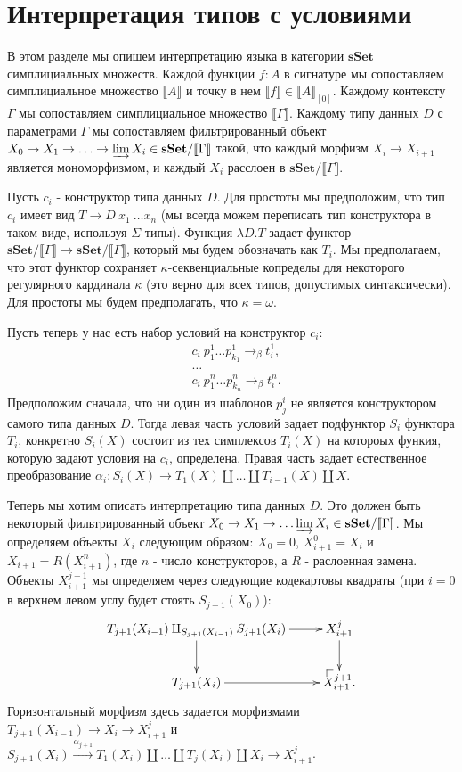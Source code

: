 \documentclass{amsart}
\makeatletter
\theoremstyle{definition}
\theoremstyle{remark}
\newcommand{\cat}[1]{\mathbf{#1}}
\newcommand{\sSet}{\cat{sSet}}
\renewcommand{\ll}{\llbracket}
\newcommand{\rr}{\rrbracket}
\numberwithin{figure}{section}
\newcommand{\po}[1][dr]{\save*!/#1+1.2pc/#1:(1,-1)@^{|-}\restore}
\makeatother
\begin{document}
\section{Интерпретация типов с условиями}

В этом разделе мы опишем интерпретацию языка в категории $\sSet$ симплициальных множеств.
Каждой функции $f : A$ в сигнатуре мы сопоставляем симплициальное множество $\ll A \rr$ и точку в нем $\ll f \rr \in \ll A \rr_{[0]}$.
Каждому контексту $\Gamma$ мы сопоставляем симплициальное множество $\ll \Gamma \rr$.
Каждому типу данных $D$ с параметрами $\Gamma$ мы сопоставляем фильтрированный объект $X_0 \to X_1 \to \ldots \to \varinjlim X_i \in \sSet / \ll \Gamma \rr$ такой,
    что каждый морфизм $X_i \to X_{i + 1}$ является мономорфизмом, и каждый $X_i$ расслоен в $\sSet / \ll \Gamma \rr$.

Пусть $c_i$ - конструктор типа данных $D$.
Для простоты мы предположим, что тип $c_i$ имеет вид $T \to D\ x_1\ \ldots x_n$ (мы всегда можем переписать тип конструктора в таком виде, используя $\Sigma$-типы).
Функция $\lambda D. T$ задает функтор $\sSet / \ll \Gamma \rr \to \sSet / \ll \Gamma \rr$, который мы будем обозначать как $T_i$.
Мы предполагаем, что этот функтор сохраняет $\kappa$-секвенциальные копределы для некоторого регулярного кардинала $\kappa$ (это верно для всех типов, допустимых синтаксически).
Для простоты мы будем предполагать, что $\kappa = \omega$.

Пусть теперь у нас есть набор условий на конструктор $c_i$:
\begin{align*}
& c_i\ p^1_1 \ldots p^1_{k_1} \to_\beta t^1_i, \\
& \ldots \\
& c_i\ p^n_1 \ldots p^n_{k_n} \to_\beta t^n_i.
\end{align*}
Предположим сначала, что ни один из шаблонов $p^i_j$ не является конструктором самого типа данных $D$.
Тогда левая часть условий задает подфунктор $S_i$ функтора $T_i$, конкретно $S_i(X)$ состоит из тех симплексов $T_i(X)$ на котороых функия, которую задают условия на $c_i$, определена.
Правая часть задает естественное преобразование $\alpha_i : S_i(X) \to T_1(X) \amalg \ldots \amalg T_{i-1}(X) \amalg X$.

Теперь мы хотим описать интерпретацию типа данных $D$. Это должен быть некоторый фильтрированный объект $X_0 \to X_1 \to \ldots \varinjlim X_i \in \sSet / \ll \Gamma \rr$.
Мы определяем объекты $X_i$ следующим образом: $X_0 = 0$, $X^0_{i+1} = X_i$ и $X_{i+1} = R(X^n_{i+1})$, где $n$ - число конструкторов, а $R$ - раслоенная замена.
Объекты $X^{j+1}_{i+1}$ мы определяем через следующие кодекартовы квадраты (при $i = 0$ в верхнем левом углу будет стоять $S_{j+1}(X_0)$):
\[ \xymatrix{ T_{j+1}(X_{i-1}) \amalg_{S_{j+1}(X_{i-1})} S_{j+1}(X_i) \ar[r] \ar[d] & X^j_{i+1} \ar[d] \\
              T_{j+1}(X_i) \ar[r] & \po X^{j+1}_{i+1}.
            } \]
Горизонтальный морфизм здесь задается морфизмами $T_{j+1}(X_{i-1}) \to X_i \to X^j_{i+1}$ и $S_{j+1}(X_i) \xrightarrow{\alpha_{j+1}} T_1(X_i) \amalg \ldots \amalg T_j(X_i) \amalg X_i \to X^j_{i+1}$.

% 
% 
\end{document}
